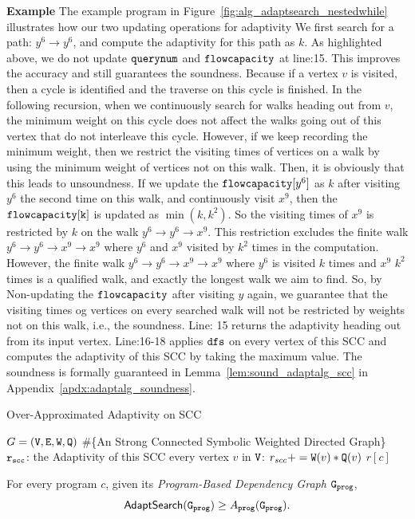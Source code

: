 \textbf{Example}
The example program in Figure~\ref{fig:alg_adaptsearch_nestedwhile} illustrates how our two updating operations for adaptivity 
We first search for a path: $y^6 \to y^6$, and compute the adaptivity for this path as 
$k$.
As highlighted above, we do not update
$\mathtt{querynum}$ and $\mathtt{flowcapacity}$ at line:15.
This improves the accuracy and still guarantees the soundness.
Because
if a vertex $v$ is visited, then a cycle is identified and  
the traverse on this cycle is finished.
%
In the following recursion, when we continuously search for walks heading out from $v$, 
the minimum weight on this cycle does not affect the walks going out of this vertex that do not interleave this cycle.
However, if we keep recording the minimum weight, then we
restrict the visiting times of vertices on a walk by
using the minimum weight of vertices not on this walk.
Then, it is obviously that this leads to unsoundness.
If we update the $\mathtt{flowcapacity}[y^6]$ as $k$ after visiting $y^6$ the second time 
on this walk,
and continuously visit $x^9$,
then the $\mathtt{flowcapacity[k]}$ is 
updated as $\min(k, k^2)$.
So
the visiting times of $x^9$ is restricted by $k$ on the walk $y^6 \to y^6 \to x^9$.
This restriction excludes the finite walk $y^6 \to y^6 \to x^9 \to x^9$ where $y^6$ and $x^9$ visited by $k^2$ times
in the computation. 
However, the finite walk $y^6 \to y^6 \to x^9 \to x^9$ where $y^6$ is visited $k$ times and $x^9$ $k^2$ times is 
a qualified walk, and exactly the longest walk we aim to find. So, by Non-updating the $\mathtt{flowcapacity}$ after 
visiting $y$ again, we guarantee that the visiting times og vertices on every searched walk will not be restricted by weights not on this walk,
i.e., the soundness.
Line: 15 returns the adaptivity heading out from its input vertex.
Line:16-18 applies $\mathtt{dfs}$ on every vertex of this SCC and 
computes the adaptivity of this SCC by taking the maximum 
value.%
The soundness is formally guaranteed in Lemma~\ref{lem:sound_adaptalg_scc} in Appendix~\ref{apdx:adaptalg_soundness}.

        \begin{algorithm}
          \caption{
          {Over-Approximated Adaptivity on SCC}
          \label{alg:overadp_alg}
          }
          \begin{algorithmic}[1]
          \REQUIRE $G = (\mathtt{V}, \mathtt{E}, \mathtt{W}, \mathtt{Q})$ \#\{An Strong Connected Symbolic Weighted Directed Graph\}
          \\
          $\mathtt{r_{scc}}$: the Adaptivity of this SCC
           every vertex $v$ in $\mathtt{V}$:
          \STATE  \qquad $r_{scc} += \mathtt{W}(v)*\mathtt{Q}(v)$  
          \RETURN $r[c]$
          \end{algorithmic}
          \end{algorithm}
\begin{thm}
    \label{thm:sound_adaptalg}
    For every program $c$, given its \emph{Program-Based Dependency Graph} $\mathtt{{G_{prog}}}$,
     $$\mathsf{AdaptSearch}(\mathtt{{G_{prog}}}) \geq A_{\mathtt{prog}}(\mathtt{{G_{prog}}}).$$
\end{thm}